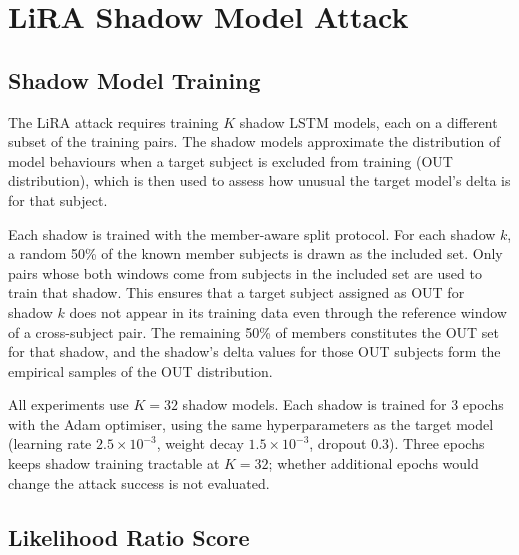 \section{LiRA Shadow Model Attack}
\label{sec:mia_lira}

\subsection{Shadow Model Training}
\label{ssec:mia_shadow_train}

The LiRA attack requires training $K$ shadow LSTM models, each on a different subset of the training pairs. The shadow models approximate the distribution of model behaviours when a target subject is excluded from training (OUT distribution), which is then used to assess how unusual the target model's delta is for that subject.

Each shadow is trained with the member-aware split protocol. For each shadow $k$, a random 50\% of the known member subjects is drawn as the included set. Only pairs whose both windows come from subjects in the included set are used to train that shadow. This ensures that a target subject assigned as OUT for shadow $k$ does not appear in its training data even through the reference window of a cross-subject pair. The remaining 50\% of members constitutes the OUT set for that shadow, and the shadow's delta values for those OUT subjects form the empirical samples of the OUT distribution.

All experiments use $K = 32$ shadow models. Each shadow is trained for 3 epochs with the Adam optimiser, using the same hyperparameters as the target model (learning rate $2.5 \times 10^{-3}$, weight decay $1.5 \times 10^{-3}$, dropout 0.3). Three epochs keeps shadow training tractable at $K = 32$; whether additional epochs would change the attack success is not evaluated.

\subsection{Likelihood Ratio Score}
\label{ssec:mia_lr_score}

